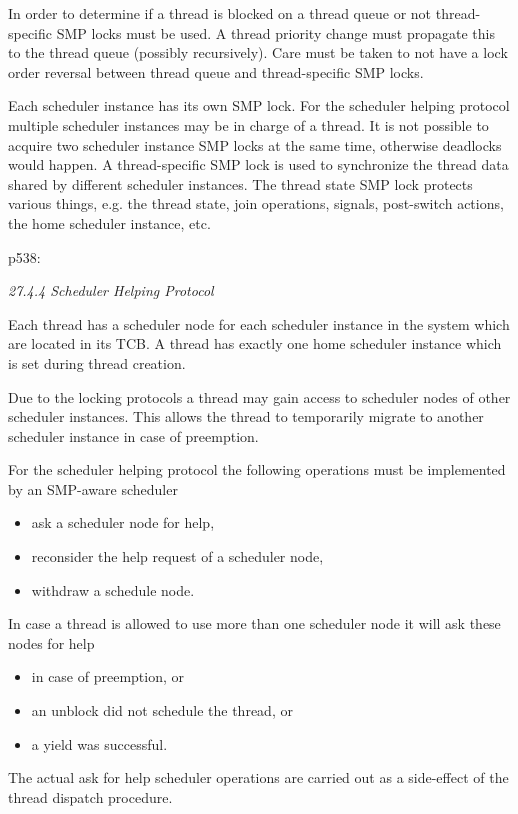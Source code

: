 In order to determine if a thread is blocked on a thread queue or not
thread-specific SMP locks must be used.
A thread priority change must propagate this to the thread queue
(possibly recursively).
Care must be taken to not have a lock order reversal between
thread queue and thread-specific SMP locks.

Each scheduler instance has its own SMP lock.
For the scheduler helping protocol
multiple scheduler instances may be in charge of a thread.
It is not possible to acquire two scheduler instance SMP locks at the same time,
otherwise deadlocks would happen.
A thread-specific SMP lock is used to synchronize the thread data
shared by different scheduler instances.
The thread state SMP lock protects various things,
e.g. the thread state,
join operations,
signals,
post-switch actions,
the home scheduler instance, etc.

p538:

\emph{27.4.4 Scheduler Helping Protocol}

Each thread has a scheduler node for each scheduler instance in
the system which are located in its TCB.
A thread has exactly one home scheduler instance
which is set during thread creation.

Due to the locking protocols a thread may gain access
to scheduler nodes of other scheduler instances.
This allows the thread to temporarily migrate
to another scheduler instance in case of preemption.

For the scheduler helping protocol the following
operations must be implemented by an SMP-aware scheduler
\begin{itemize}
  \item ask a scheduler node for help,
  \item reconsider the help request of a scheduler node,
  \item withdraw a schedule node.
\end{itemize}

In case a thread is allowed to use more than one scheduler node
it will ask these nodes for help
\begin{itemize}
  \item in case of preemption, or
  \item an unblock did not schedule the thread, or
  \item a yield was successful.
\end{itemize}

The actual ask for help scheduler operations are carried out
as a side-effect of the thread dispatch procedure.

